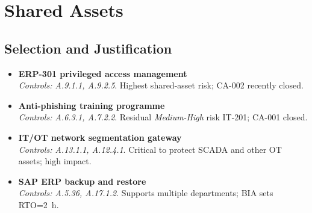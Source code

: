 \section{Shared Assets}
\subsection{Selection and Justification}
\begin{itemize}
  \item \textbf{ERP-301 privileged access management}\\
        \emph{Controls: A.9.1.1, A.9.2.5}.  
        Highest shared-asset risk; CA-002 recently closed.
  \item \textbf{Anti-phishing training programme}\\
        \emph{Controls: A.6.3.1, A.7.2.2}.  
        Residual \emph{Medium-High} risk IT-201; CA-001 closed.
  \item \textbf{\ac{IT}/\ac{OT} network segmentation gateway}\\
        \emph{Controls: A.13.1.1, A.12.4.1}.  
        Critical to protect SCADA and other \ac{OT} assets; high impact.
  \item \textbf{SAP ERP backup and restore}\\
        \emph{Controls: A.5.36, A.17.1.2}.  
        Supports multiple departments; \ac{BIA} sets \ac{RTO}=2~h.
\end{itemize}

